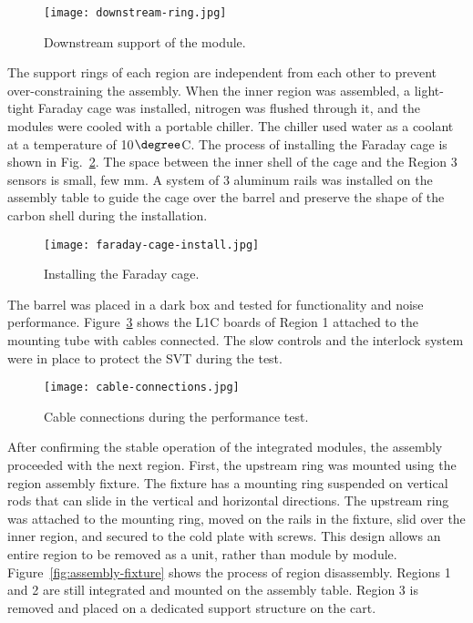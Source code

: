 \begin{figure}[h] 
\centering 
\texttt{[image: downstream-ring.jpg]}
\caption{Downstream support of the module.}
\label{fig:downstream-ring}
\end{figure}

The support rings of each region are independent from each other to prevent over-constraining the assembly. When the inner region was assembled, a light-tight Faraday cage was installed, nitrogen was flushed through it, and the modules were cooled with a portable chiller. The chiller used water as a coolant at a temperature of 10$\degree$C. The process of installing the Faraday cage is shown in Fig.~\ref{fig:faraday-cage-install}. The space between the inner shell of the cage and the Region 3 sensors is small, few mm. A system of 3 aluminum rails was installed on the assembly table to guide the cage over the barrel and preserve the shape of the carbon shell during the installation. 

\begin{figure}[h] 
\centering 
\texttt{[image: faraday-cage-install.jpg]}
\caption{Installing the Faraday cage.}
\label{fig:faraday-cage-install}
\end{figure}

The barrel was placed in a dark box and tested for functionality and noise performance. Figure~\ref{fig:cable-connections} shows the L1C boards of Region 1 attached to the mounting tube with cables connected. The slow controls and the interlock system were in place to protect the SVT during the test.

\begin{figure}[h] 
\centering 
\texttt{[image: cable-connections.jpg]}
\caption{Cable connections during the performance test.}
\label{fig:cable-connections}
\end{figure}
 
After confirming the stable operation of the integrated modules, the assembly proceeded with the next region. First, the upstream ring was mounted using the region assembly fixture. The fixture has a mounting ring suspended on vertical rods that can slide in the vertical and horizontal directions. The upstream ring was attached to the mounting ring, moved on the rails in the fixture, slid over the inner region, and secured to the cold plate with screws. This design allows an entire region to be removed as a unit, rather than module by module. Figure~\ref{fig:assembly-fixture} shows the process of region disassembly. Regions 1 and 2 are still integrated and mounted on the assembly table. Region 3 is removed and placed on a dedicated support structure on the cart.

